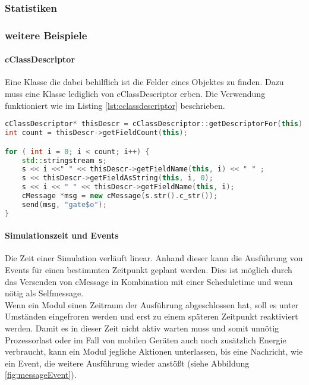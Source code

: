 \subsubsection{Statistiken}


\subsubsection{weitere Beispiele}

\paragraph{cClassDescriptor} Eine Klasse die dabei behilflich ist die Felder eines Objektes zu finden. Dazu muss eine Klasse lediglich von cClassDescriptor erben. Die Verwendung funktioniert wie im Listing \ref{lst:cclassdescriptor} beschrieben.

\begin{minipage}{\textwidth}
\begin{lstlisting}[language=C++,caption={Verwendung von cClassDescriptor },label=lst:cclassdescriptor]
cClassDescriptor* thisDescr = cClassDescriptor::getDescriptorFor(this);
int count = thisDescr->getFieldCount(this);

for ( int i = 0; i < count; i++) {
    std::stringstream s;
    s << i <<" " << thisDescr->getFieldName(this, i) << " " ;
    s << thisDescr->getFieldAsString(this, i, 0);
    s << i << " " << thisDescr->getFieldName(this, i);
    cMessage *msg = new cMessage(s.str().c_str());
    send(msg, "gate$o");
}
\end{lstlisting}
\end{minipage}

\paragraph{Simulationszeit und Events}

Die Zeit einer Simulation verläuft linear. Anhand dieser kann die Ausführung von Events für einen bestimmten Zeitpunkt geplant werden. Dies ist möglich durch das Versenden von cMessage in Kombination mit einer Scheduletime und wenn nötig als Selfmessage.\\
Wenn ein Modul einen Zeitraum der Ausführung abgeschlossen hat, soll es unter Umständen eingefroren werden und erst zu einem späteren Zeitpunkt reaktiviert werden. Damit es in dieser Zeit nicht aktiv warten muss und somit unnötig Prozessorlast oder im Fall von mobilen Geräten auch noch zusätzlich Energie verbraucht, kann ein Modul jegliche Aktionen unterlassen, bis eine Nachricht, wie ein Event, die weitere Ausführung wieder anstößt (siehe Abbildung \ref{fig:messageEvent}). 

